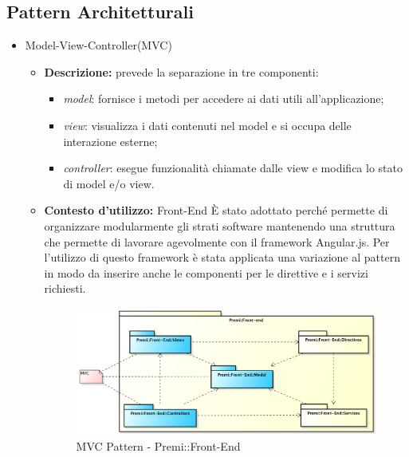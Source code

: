 \subsection{Pattern Architetturali}
\begin{itemize}
	\item Model-View-Controller(\gls{MVC})
	\begin{itemize}
		\item \textbf{Descrizione:} prevede la separazione in tre componenti:
		\begin{itemize}
			\item \textit{model}: fornisce i metodi per accedere ai dati utili all'applicazione;
			\item \textit{view}:  visualizza i dati contenuti nel model e si occupa delle interazione esterne;
			\item \textit{controller}: esegue funzionalità chiamate dalle view e modifica lo stato di model e/o view.
		\end{itemize}
		\item \textbf{Contesto d'utilizzo:} \gls{Front-End} \newline È stato adottato perché permette di organizzare modularmente gli strati software mantenendo una struttura che permette di lavorare agevolmente con il \gls{framework} \gls{Angular}.js. Per l'utilizzo di questo framework è stata applicata una variazione al pattern in modo da inserire anche le componenti per le direttive e i servizi richiesti.
		\begin{figure}[h]
			\centering
			\includegraphics[width=\linewidth]{img/front-end_mvc}
			\caption[MVC Pattern - Premi::Front-End]{MVC Pattern - Premi::Front-End}
		\end{figure}
	\end{itemize}
\end{itemize}

